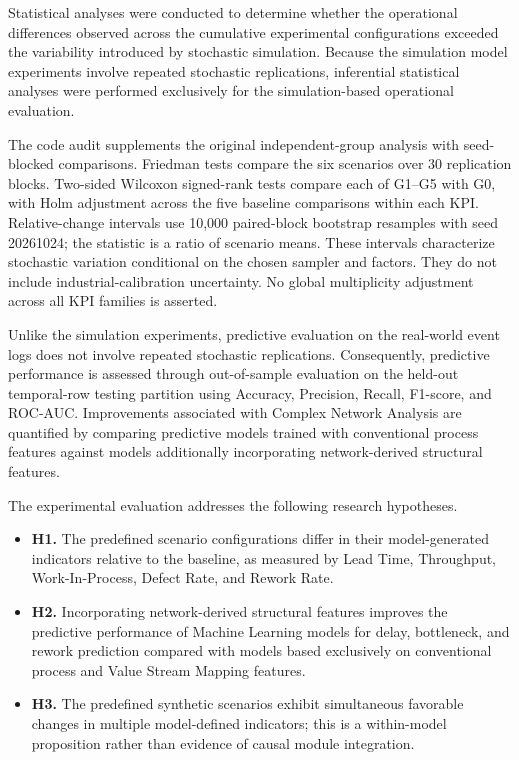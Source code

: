 \documentclass[pdflatex,iicol,Numbered,sn-basic]{sn-jnl}
\begin{document}
Statistical analyses were conducted to determine whether the operational differences observed across the cumulative experimental configurations exceeded the variability introduced by stochastic simulation. Because the simulation model experiments involve repeated stochastic replications, inferential statistical analyses were performed exclusively for the simulation-based operational evaluation.

The code audit supplements the original independent-group analysis with seed-blocked comparisons. Friedman tests compare the six scenarios over 30 replication blocks. Two-sided Wilcoxon signed-rank tests compare each of G1--G5 with G0, with Holm adjustment across the five baseline comparisons within each KPI. Relative-change intervals use 10,000 paired-block bootstrap resamples with seed 20261024; the statistic is a ratio of scenario means. These intervals characterize stochastic variation conditional on the chosen sampler and factors. They do not include industrial-calibration uncertainty. No global multiplicity adjustment across all KPI families is asserted.

Unlike the simulation experiments, predictive evaluation on the real-world event logs does not involve repeated stochastic replications. Consequently, predictive performance is assessed through out-of-sample evaluation on the held-out temporal-row testing partition using Accuracy, Precision, Recall, F1-score, and ROC-AUC. Improvements associated with Complex Network Analysis are quantified by comparing predictive models trained with conventional process features against models additionally incorporating network-derived structural features.

The experimental evaluation addresses the following research hypotheses.

\begin{itemize}

\item \textbf{H1.} The predefined scenario configurations differ in their model-generated indicators relative to the baseline, as measured by Lead Time, Throughput, Work-In-Process, Defect Rate, and Rework Rate.

\item \textbf{H2.} Incorporating network-derived structural features improves the predictive performance of Machine Learning models for delay, bottleneck, and rework prediction compared with models based exclusively on conventional process and Value Stream Mapping features.

\item \textbf{H3.} The predefined synthetic scenarios exhibit simultaneous favorable changes in multiple model-defined indicators; this is a within-model proposition rather than evidence of causal module integration.

\end{itemize}
\end{document}
